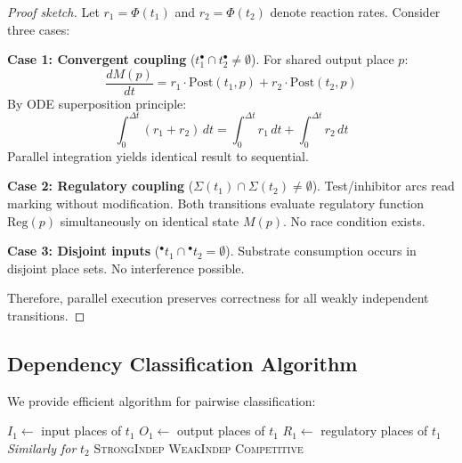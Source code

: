 \begin{proof}[Proof sketch]
Let $r_1 = \Phi(t_1)$ and $r_2 = \Phi(t_2)$ denote reaction rates. Consider three cases:

\vspace{3pt}
\noindent\textbf{Case 1: Convergent coupling} ($t_1^\bullet \cap t_2^\bullet \neq \emptyset$). For shared output place $p$:
\[
\frac{dM(p)}{dt} = r_1 \cdot \text{Post}(t_1, p) + r_2 \cdot \text{Post}(t_2, p)
\]
By ODE superposition principle:
\[
\int_0^{\Delta t} (r_1 + r_2) \, dt = \int_0^{\Delta t} r_1 \, dt + \int_0^{\Delta t} r_2 \, dt
\]
Parallel integration yields identical result to sequential.

\vspace{3pt}
\noindent\textbf{Case 2: Regulatory coupling} ($\Sigma(t_1) \cap \Sigma(t_2) \neq \emptyset$). Test/inhibitor arcs read marking without modification. Both transitions evaluate regulatory function $\text{Reg}(p)$ simultaneously on identical state $M(p)$. No race condition exists.

\vspace{3pt}
\noindent\textbf{Case 3: Disjoint inputs} (${}^\bullet t_1 \cap {}^\bullet t_2 = \emptyset$). Substrate consumption occurs in disjoint place sets. No interference possible.

\vspace{3pt}
\noindent Therefore, parallel execution preserves correctness for all weakly independent transitions.
\end{proof}

\subsection{Dependency Classification Algorithm}

We provide efficient algorithm for pairwise classification:

\begin{algorithm}[h]
\small
\caption{Classify Dependency}
\begin{algorithmic}[1]
    \State $I_1 \gets$ input places of $t_1$
    \State $O_1 \gets$ output places of $t_1$
    \State $R_1 \gets$ regulatory places of $t_1$
    \State \textit{Similarly for} $t_2$
        \State \Return \textsc{StrongIndep}
        \State \Return \textsc{WeakIndep}
    \Else
        \State \Return \textsc{Competitive}
    \EndIf
\EndProcedure
\end{algorithmic}
\end{algorithm}

